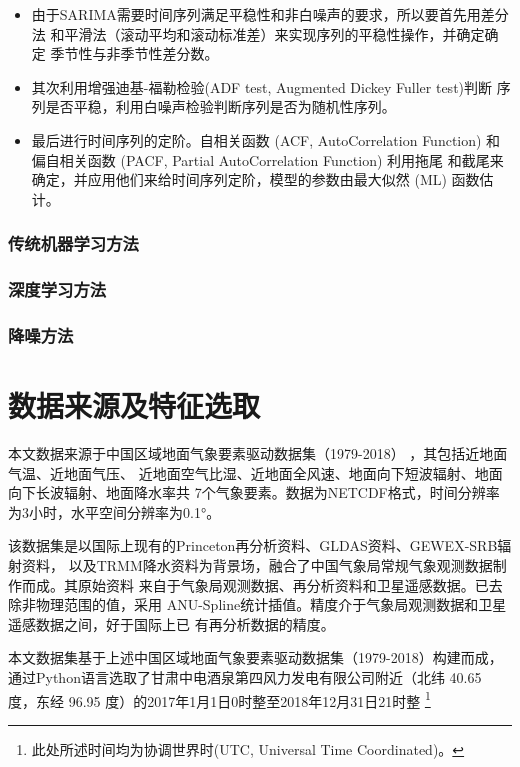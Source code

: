 \documentclass[AutoFakeBold]{LZUThesis}
\begin{document}
\begin{itemize}
\item 由于SARIMA需要时间序列满足平稳性和非白噪声的要求，所以要首先用差分法
和平滑法（滚动平均和滚动标准差）来实现序列的平稳性操作，并确定确定
季节性与非季节性差分数。
\item 其次利用增强迪基-福勒检验(ADF test, Augmented Dickey Fuller test)判断
序列是否平稳，利用白噪声检验判断序列是否为随机性序列。
\item 最后进行时间序列的定阶。自相关函数 (ACF, AutoCorrelation Function)
和偏自相关函数 (PACF, Partial AutoCorrelation Function) 利用拖尾
和截尾来确定，并应用他们来给时间序列定阶，模型的参数由最大似然 (ML) 
函数估计。
\end{itemize}
\subsection{传统机器学习方法}

\subsection{深度学习方法}

\subsection{降噪方法}



\chapter{数据来源及特征选取}
本文数据来源于中国区域地面气象要素驱动数据集（1979-2018）
\cite{8028b944-daaa-4511-8769-965612652c49}，其包括近地面气温、近地面气压、
近地面空气比湿、近地面全风速、地面向下短波辐射、地面向下长波辐射、地面降水率共
7个气象要素。数据为NETCDF格式，时间分辨率为3小时，水平空间分辨率为0.1°。
\cite{37cab0ac-d066-4fb9-aa9c-1cf50d601096}

该数据集是以国际上现有的Princeton再分析资料、GLDAS资料、GEWEX-SRB辐射资料，
以及TRMM降水资料为背景场，融合了中国气象局常规气象观测数据制作而成。其原始资料
来自于气象局观测数据、再分析资料和卫星遥感数据。已去除非物理范围的值，采用
ANU-Spline统计插值。精度介于气象局观测数据和卫星遥感数据之间，好于国际上已
有再分析数据的精度。\cite{6bab74c1-f2dd-4e24-a833-81f33bedf9b1}

本文数据集基于上述中国区域地面气象要素驱动数据集（1979-2018）构建而成，
通过Python语言选取了甘肃中电酒泉第四风力发电有限公司附近（北纬
40.65 度，东经 96.95 度）的2017年1月1日0时整至2018年12月31日21时整
\footnote{此处所述时间均为协调世界时(UTC, Universal Time Coordinated)。}
\end{document}
